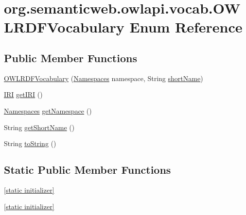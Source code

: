 \hypertarget{enumorg_1_1semanticweb_1_1owlapi_1_1vocab_1_1_o_w_l_r_d_f_vocabulary}{\section{org.\-semanticweb.\-owlapi.\-vocab.\-O\-W\-L\-R\-D\-F\-Vocabulary Enum Reference}
\label{enumorg_1_1semanticweb_1_1owlapi_1_1vocab_1_1_o_w_l_r_d_f_vocabulary}
}
\subsection*{Public Member Functions}
\begin{DoxyCompactItemize}
\item 
\hyperlink{enumorg_1_1semanticweb_1_1owlapi_1_1vocab_1_1_o_w_l_r_d_f_vocabulary_ad49470e641d8d582b6fa0ca011eeb9de}{O\-W\-L\-R\-D\-F\-Vocabulary} (\hyperlink{enumorg_1_1semanticweb_1_1owlapi_1_1vocab_1_1_namespaces}{Namespaces} namespace, String \hyperlink{enumorg_1_1semanticweb_1_1owlapi_1_1vocab_1_1_o_w_l_r_d_f_vocabulary_a57d3a21e4214cca32546506ea3a5c750}{short\-Name})
\item 
\hyperlink{classorg_1_1semanticweb_1_1owlapi_1_1model_1_1_i_r_i}{I\-R\-I} \hyperlink{enumorg_1_1semanticweb_1_1owlapi_1_1vocab_1_1_o_w_l_r_d_f_vocabulary_a207905766bee2c443de182781ee92b59}{get\-I\-R\-I} ()
\item 
\hyperlink{enumorg_1_1semanticweb_1_1owlapi_1_1vocab_1_1_namespaces}{Namespaces} \hyperlink{enumorg_1_1semanticweb_1_1owlapi_1_1vocab_1_1_o_w_l_r_d_f_vocabulary_aa8fe0daf6377fbb503e8916485749b87}{get\-Namespace} ()
\item 
String \hyperlink{enumorg_1_1semanticweb_1_1owlapi_1_1vocab_1_1_o_w_l_r_d_f_vocabulary_a45fc41d7378b5892a86ae13d2ad4a9f1}{get\-Short\-Name} ()
\item 
String \hyperlink{enumorg_1_1semanticweb_1_1owlapi_1_1vocab_1_1_o_w_l_r_d_f_vocabulary_acd3af7b82a07603c196cd2f80ee8ec5b}{to\-String} ()
\end{DoxyCompactItemize}
\subsection*{Static Public Member Functions}
\begin{DoxyCompactItemize}
\item 
\hyperlink{enumorg_1_1semanticweb_1_1owlapi_1_1vocab_1_1_o_w_l_r_d_f_vocabulary_a2e539a03556754e22fdc374c83471a47}{\mbox{[}static initializer\mbox{]}}
\item 
\hyperlink{enumorg_1_1semanticweb_1_1owlapi_1_1vocab_1_1_o_w_l_r_d_f_vocabulary_a2e539a03556754e22fdc374c83471a47}{\mbox{[}static initializer\mbox{]}}
\end{DoxyCompactItemize}

